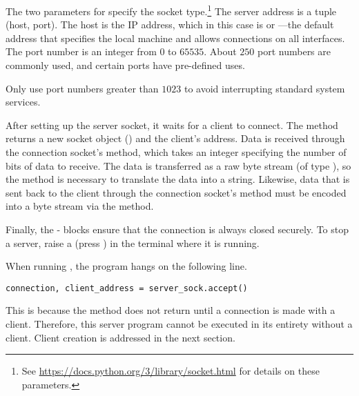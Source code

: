 The two parameters for  specify the socket type.\footnote{See \url{https://docs.python.org/3/library/socket.html} for details on these parameters.}
The server address is a tuple (host, port).
The host is the IP address, which in this case is  or ---the default address that specifies the local machine and allows connections on all interfaces.
The port number is an integer from $0$ to $65535$.
About $250$ port numbers are commonly used, and certain ports have pre-defined uses.
\begin{warn}
Only use port numbers greater than $1023$ to avoid interrupting standard system services.
\end{warn}

After setting up the server socket, it waits for a client to connect.
The  method returns a new socket object () and the client's address.
Data is received through the connection socket's  method, which takes an integer specifying the number of bits of data to receive.
The data is transferred as a raw byte stream (of type ), so the  method is necessary to translate the data into a string.
Likewise, data that is sent back to the client through the connection socket's  method must be encoded into a byte stream via the  method.

Finally, the - blocks ensure that the connection is always closed securely.
To stop a server, raise a  (press ) in the terminal where it is running.

\begin{info}
When running , the program hangs on the following line.
\begin{lstlisting}
connection, client_address = server_sock.accept()
\end{lstlisting}
This is because the  method does not return until a connection is made with a client.
Therefore, this server program cannot be executed in its entirety without a client.
Client creation is addressed in the next section.
\end{info}

